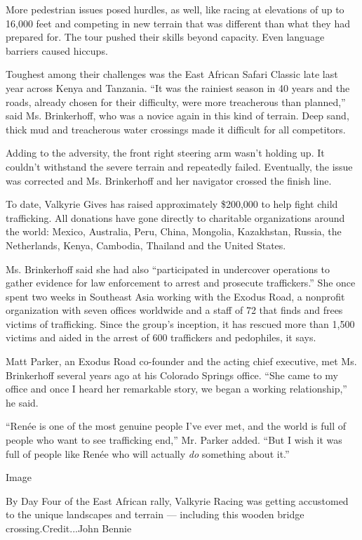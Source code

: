 More pedestrian issues posed hurdles, as well, like racing at elevations
of up to 16,000 feet and competing in new terrain that was different
than what they had prepared for. The tour pushed their skills beyond
capacity. Even language barriers caused hiccups.

Toughest among their challenges was the East African Safari Classic late
last year across Kenya and Tanzania. ``It was the rainiest season in 40
years and the roads, already chosen for their difficulty, were more
treacherous than planned,'' said Ms. Brinkerhoff, who was a novice again
in this kind of terrain. Deep sand, thick mud and treacherous water
crossings made it difficult for all competitors.

Adding to the adversity, the front right steering arm wasn't holding up.
It couldn't withstand the severe terrain and repeatedly failed.
Eventually, the issue was corrected and Ms. Brinkerhoff and her
navigator crossed the finish line.

To date, Valkyrie Gives has raised approximately \$200,000 to help fight
child trafficking. All donations have gone directly to charitable
organizations around the world: Mexico, Australia, Peru, China,
Mongolia, Kazakhstan, Russia, the Netherlands, Kenya, Cambodia, Thailand
and the United States.

Ms. Brinkerhoff said she had also ``participated in undercover
operations to gather evidence for law enforcement to arrest and
prosecute traffickers.'' She once spent two weeks in Southeast Asia
working with the Exodus Road, a nonprofit organization with seven
offices worldwide and a staff of 72 that finds and frees victims of
trafficking. Since the group's inception, it has rescued more than 1,500
victims and aided in the arrest of 600 traffickers and pedophiles, it
says.

Matt Parker, an Exodus Road co-founder and the acting chief executive,
met Ms. Brinkerhoff several years ago at his Colorado Springs office.
``She came to my office and once I heard her remarkable story, we began
a working relationship,'' he said.

``Renée is one of the most genuine people I've ever met, and the world
is full of people who want to see trafficking end,'' Mr. Parker added.
``But I wish it was full of people like Renée who will actually
\emph{do} something about it.''

Image

By Day Four of the East African rally, Valkyrie Racing was getting
accustomed to the unique landscapes and terrain --- including this
wooden bridge crossing.Credit...John Bennie

